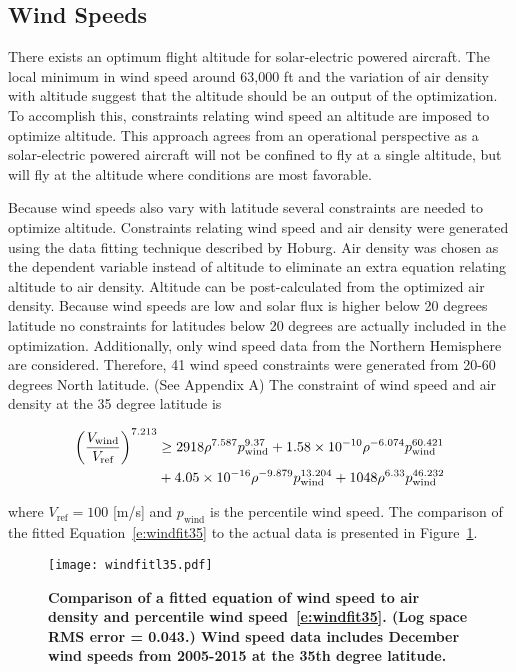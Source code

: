 \documentclass[]{aiaa-tc}%
\begin{document}
\subsection{Wind Speeds}

There exists an optimum flight altitude for solar-electric powered aircraft.  
The local minimum in wind speed around 63,000 ft and the variation of air density with altitude suggest that the altitude should be an output of the optimization. 
To accomplish this, constraints relating wind speed an altitude are imposed to optimize altitude. 
This approach agrees from an operational perspective as a solar-electric powered aircraft will not be confined to fly at a single altitude, but will fly at the altitude where conditions are most favorable. 

Because wind speeds also vary with latitude several constraints are needed to optimize altitude. 
Constraints relating wind speed and air density were generated using the data fitting technique described by Hoburg\cite{fitting}.
Air density was chosen as the dependent variable instead of altitude to eliminate an extra equation relating altitude to air density. 
Altitude can be post-calculated from the optimized air density. 
Because wind speeds are low and solar flux is higher below 20 degrees latitude no constraints for latitudes below 20 degrees are actually included in the optimization. 
Additionally, only wind speed data from the Northern Hemisphere are considered.
Therefore, 41 wind speed constraints were generated from 20-60 degrees North latitude. (See Appendix A) 
The constraint of wind speed and air density at the 35 degree latitude is 

\begin{align}
    \left(\frac{V_{\text{wind}}}{V_{\text{ref}}}\right)^{7.213} &\geq 2918\rho^{7.587}p_{\text{wind}}^{9.37} + \num{1.58d-10}\rho^{-6.074}p_{\text{wind}}^{60.421} \nonumber \\
    \label{e:windfit35}
    &+ \num{4.05d-16}\rho^{-9.879}p_{\text{wind}}^{13.204} + 1048\rho^{6.33}p_{\text{wind}}^{46.232}
\end{align}

where $V_{\text{ref}} = 100$ [m/s] and $p_{\text{wind}}$ is the percentile wind speed. The comparison of the fitted Equation~\eqref{e:windfit35} to the actual data is presented in Figure~\ref{f:windfitl35}. 

\begin{figure}[H]
	\begin{center}
	\texttt{[image: windfitl35.pdf]}
    \caption{\textbf{Comparison of a fitted equation of wind speed to air density and percentile wind speed~\eqref{e:windfit35}. (Log space RMS error = 0.043.) Wind speed data includes December wind speeds from 2005-2015 at the 35th degree latitude.}}
	\label{f:windfitl35}
	\end{center}
\end{figure}
\end{document}
